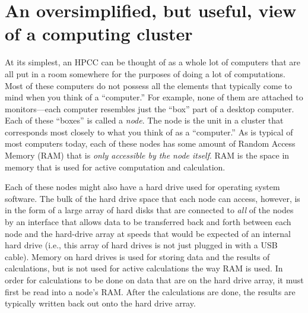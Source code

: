 \documentclass[]{krantz}
\begin{document}
\hypertarget{an-oversimplified-but-useful-view-of-a-computing-cluster}{%
\section{An oversimplified, but useful, view of a computing cluster}\label{an-oversimplified-but-useful-view-of-a-computing-cluster}}

At its simplest, an HPCC can be thought of as a whole lot of computers that are all
put in a room somewhere for the purposes of doing a lot of computations. Most of these
computers do not possess all the elements that typically come to mind when you
think of a ``computer.'' For example, none of them are attached to monitors---each
computer resembles just the ``box'' part of a desktop computer. Each of these ``boxes'' is called
a \emph{node}. The node is the unit in a cluster that corresponds most closely to what you think of
as a ``computer.'' As is typical of most computers today, each of these nodes has some
amount of Random Access Memory (RAM) that is \emph{only accessible by the node itself}. RAM
is the space in memory that is used for active computation and calculation.

Each of these
nodes might also have a hard drive used for operating system software. The bulk of the
hard drive space that each node can access, however, is in the form of a large array of hard disks
that are connected to \emph{all} of the nodes by an interface that allows data to be transferred
back and forth between each node and the hard-drive array at speeds that would be expected of
an internal hard drive (i.e., this array of hard drives is not just plugged in with a USB
cable). Memory on hard drives is used for storing data and the results of calculations, but
is not used for active calculations the way RAM is used. In order for calculations to be done
on data that are on the hard drive array, it must first be read into a node's RAM. After the calculations
are done, the results are typically written back out onto the hard drive array.
\end{document}
